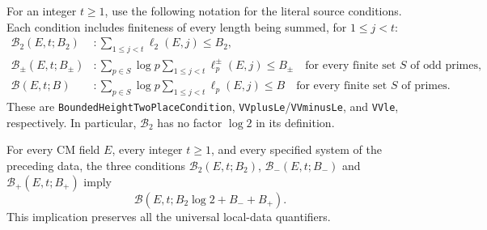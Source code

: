 For an integer $t\ge1$, use the following notation for the literal source
conditions.  Each condition includes finiteness of every length being
summed, for $1\le j<t$:
\begin{align*}
 \mathcal B_2(E,t;B_2)&:
       \sum_{1\le j<t}\ell_2(E,j)\le B_2,\\
 \mathcal B_\pm(E,t;B_\pm)&:
       \sum_{p\in S}\log p\sum_{1\le j<t}\ell_p^\pm(E,j)\le B_\pm
       \quad\text{for every finite set $S$ of odd primes},\\
 \mathcal B(E,t;B)&:
       \sum_{p\in S}\log p\sum_{1\le j<t}\ell_p(E,j)\le B
       \quad\text{for every finite set $S$ of primes}.
\end{align*}
These are \texttt{BoundedHeightTwoPlaceCondition},
\texttt{VVplusLe}/\texttt{VVminusLe}, and \texttt{VVle}, respectively.
In particular, $\mathcal B_2$ has no factor $\log2$ in its definition.

\begin{proposition}\label{prop:vw-parts}
For every CM field $E$, every integer $t\ge1$, and every specified
system of the preceding data, the three conditions
$\mathcal B_2(E,t;B_2)$, $\mathcal B_-(E,t;B_-)$ and
$\mathcal B_+(E,t;B_+)$ imply
\[
                 \mathcal B(E,t;B_2\log2+B_-+B_+).
                 \tag{VW.1}
\]
This implication preserves all the universal local-data quantifiers.
\end{proposition}

